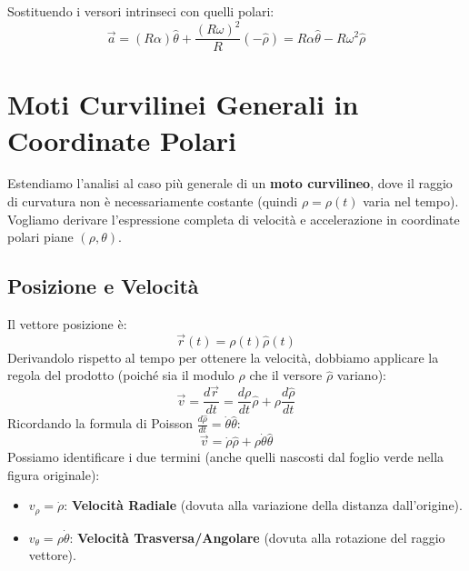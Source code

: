 Sostituendo i versori intrinseci con quelli polari:
\begin{equation}
    \vec{a} = (R\alpha)\hat{\theta} + \frac{(R\omega)^2}{R}(-\hat{\rho}) = R\alpha \hat{\theta} - R\omega^2 \hat{\rho}
\end{equation}

\clearpage
\section{Moti Curvilinei Generali in Coordinate Polari}
Estendiamo l'analisi al caso più generale di un \textbf{moto curvilineo}, dove il raggio di curvatura non è necessariamente costante (quindi $\rho = \rho(t)$ varia nel tempo). Vogliamo derivare l'espressione completa di velocità e accelerazione in coordinate polari piane $(\rho, \theta)$.

\subsection{Posizione e Velocità}
Il vettore posizione è:
\begin{equation}
    \vec{r}(t) = \rho(t) \hat{\rho}(t)
\end{equation}
Derivandolo rispetto al tempo per ottenere la velocità, dobbiamo applicare la regola del prodotto (poiché sia il modulo $\rho$ che il versore $\hat{\rho}$ variano):
\begin{equation}
    \vec{v} = \frac{d\vec{r}}{dt} = \frac{d\rho}{dt}\hat{\rho} + \rho\frac{d\hat{\rho}}{dt}
\end{equation}
Ricordando la formula di Poisson $\frac{d\hat{\rho}}{dt} = \dot{\theta}\hat{\theta}$:
\begin{equation}
    \vec{v} = \dot{\rho}\hat{\rho} + \rho\dot{\theta}\hat{\theta}
\end{equation}
Possiamo identificare i due termini (anche quelli nascosti dal foglio verde nella figura originale):
\begin{itemize}
    \item $v_\rho = \dot{\rho}$: \textbf{Velocità Radiale} (dovuta alla variazione della distanza dall'origine).
    \item $v_\theta = \rho\dot{\theta}$: \textbf{Velocità Trasversa/Angolare} (dovuta alla rotazione del raggio vettore).
\end{itemize}

